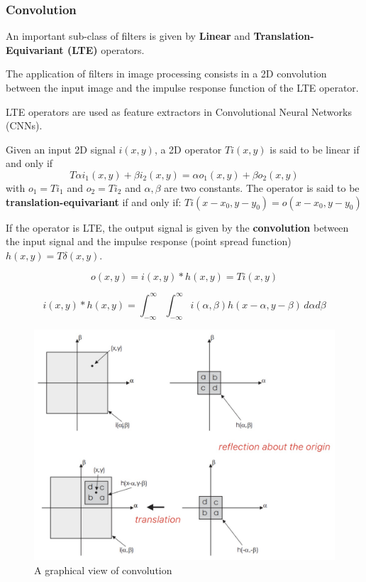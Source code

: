 \documentclass{article}
\begin{document}
\subsubsection{Convolution}

An important sub-class of filters is given by \textbf{Linear} and \textbf{Translation-Equivariant (LTE)} operators.

The application of filters in image processing consists in a 2D convolution between the input image and the impulse response function of the LTE operator.

LTE operators are used as feature extractors in Convolutional Neural Networks (CNNs).

Given an input 2D signal $i(x,y)$, a 2D operator $T{i(x,y)}$ is said to be linear if and only if
$$ T{\alpha i_1(x,y) + \beta i_2(x,y)} = \alpha o_1(x,y) + \beta o_2(x,y) $$ with $o_1 = T{i_1}$ and $o_2 = T{i_2}$ and $\alpha, \beta$ are two constants.
The operator is said to be \textbf{translation-equivariant} if and only if: $T{i(x-x_0, y-y_0)} = o(x-x_0, y-y_0)$

If the operator is LTE, the output signal is given by the \textbf{convolution} between the input signal and the impulse response (point spread function) $h(x,y) = T{\delta (x,y)}$.

$$o(x,y) = i(x,y) * h(x,y) = T{i(x,y)}$$

$$i(x,y) * h(x,y) = \int_{-\infty}^{\infty} \int_{-\infty}^{\infty} i(\alpha, \beta) h(x-\alpha, y-\beta) \, d\alpha  d\beta $$

\begin{figure}[htbp]
  \centering
  \includegraphics[width=0.7\linewidth]{./img/graphical_convolution.jpg}
  \caption{A graphical view of convolution}
  \label{fig:graphical_convolution}
\end{figure}
\end{document}
